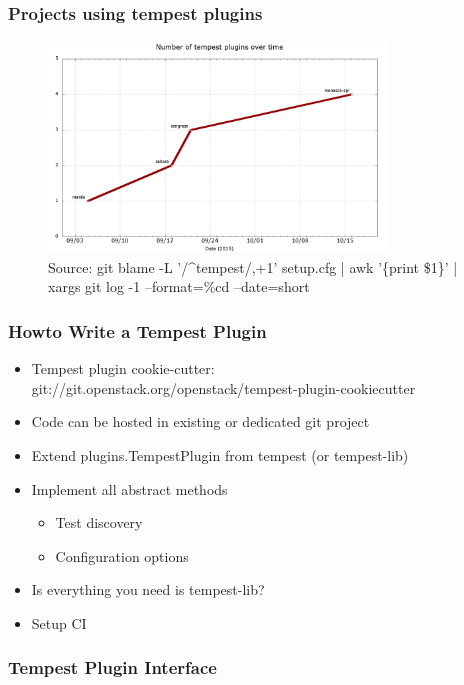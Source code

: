 \documentclass[aspectratio=169,11pt,hyperref={colorlinks=true}]{beamer}
\begin{document}
\begin{frame}
    \frametitle{Projects using tempest plugins}
    \begin{figure}[p]
    	\centering
    	\includegraphics[width=0.8\textwidth]{tempest-plugins.png}
        \caption{Source: git blame -L '/\^{}tempest/,+1' setup.cfg | awk '\{print \$1\}' | xargs git log -1 --format=\%cd --date=short}
    \end{figure}
\end{frame}

\begin{frame}
    \frametitle{Howto Write a Tempest Plugin}
    \begin{itemize}
        \item Tempest plugin cookie-cutter: \hfill
        \\ git://git.openstack.org/openstack/tempest-plugin-cookiecutter
    \end{itemize}

    \begin{itemize}
    	\item{Code can be hosted in existing or dedicated git project}
    	\item{Extend plugins.TempestPlugin from tempest (or tempest-lib)}
    	\item{Implement all abstract methods}
    		\begin{itemize}
    			\item{Test discovery}
    			\item{Configuration options}
    		\end{itemize}
    	\item{Is everything you need is tempest-lib?}
    	\item{Setup CI}
    \end{itemize}
\end{frame}

\begin{frame}
    \frametitle{Tempest Plugin Interface}
        
\end{frame}
\end{document}
